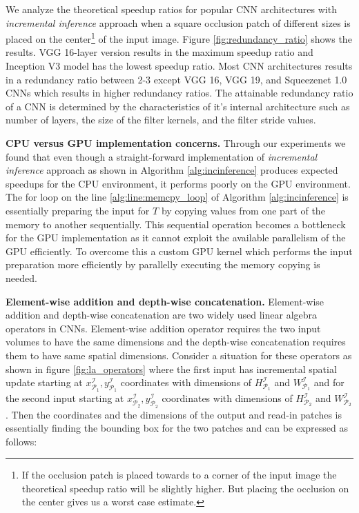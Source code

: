 We analyze the theoretical speedup ratios for popular CNN architectures with \textit{incremental inference} approach when a square occlusion patch of different sizes is placed on the center\footnote{If the occlusion patch is placed towards to a corner of the input image the theoretical speedup ratio will be slightly higher. But placing the occlusion on the center gives us a worst case estimate.} of the input image. Figure \ref{fig:redundancy_ratio} shows the results. VGG 16-layer version results in the maximum speedup ratio and Inception V3 model has the lowest speedup ratio. Most CNN architectures results in a redundancy ratio between 2-3 except VGG 16, VGG 19, and Squeezenet 1.0 CNNs which results in higher redundancy ratios. The attainable redundancy ratio of a CNN is determined by the characteristics of it's internal architecture such as number of layers, the size of the filter kernels, and the filter stride values.


\vspace{2mm}
\noindent \textbf{CPU versus GPU implementation concerns.}
Through our experiments we found that even though a straight-forward implementation of \textit{incremental inference} approach as shown in Algorithm \ref{alg:incinference} produces expected speedups for the CPU environment, it performs poorly on the GPU environment.
The for loop on the line \ref{alg:line:memcpy_loop} of Algorithm \ref{alg:incinference} is essentially preparing the input for $T$ by copying values from one part of the memory to another sequentially.
This sequential operation becomes a bottleneck for the GPU implementation as it cannot exploit the available parallelism of the GPU efficiently.
To overcome this a custom GPU kernel which performs the input preparation more efficiently by parallelly executing the memory copying is needed.


\vspace{2mm}
\noindent \textbf{Element-wise addition and depth-wise concatenation.}
Element-wise addition and depth-wise concatenation are two widely used linear algebra operators in CNNs.
Element-wise addition operator requires the two input volumes to have the same dimensions and the depth-wise concatenation requires them to have same spatial dimensions.
Consider a situation for these operators as shown in figure \ref{fig:la_operators} where the first input has incremental spatial update starting at $x^\mathcal{I}_{\mathcal{P}_1},y^\mathcal{I}_{\mathcal{P}_1}$ coordinates with dimensions of $H^\mathcal{I}_{\mathcal{P}_1}$ and $W^\mathcal{I}_{\mathcal{P}_1}$ and for the second input starting at $x^\mathcal{I}_{\mathcal{P}_2},y^\mathcal{I}_{\mathcal{P}_2}$ coordinates with dimensions of $H^\mathcal{I}_{\mathcal{P}_2}$ and $W^\mathcal{I}_{\mathcal{P}_2}$.
Then the coordinates and the dimensions of the output and read-in patches is essentially finding the bounding box for the two patches and can be expressed as follows:


